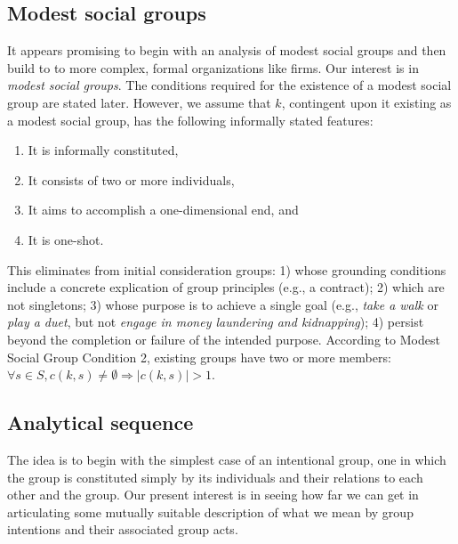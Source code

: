 \documentclass[
11pt,
titlepage,
reqno,
]{article}%
\theoremstyle{definition}
\begin{document}
	
	
	\subsection{Modest social groups} 
	It appears promising to begin with an analysis of modest social groups and then build to to more complex, formal organizations like firms.  Our interest is in \textit{modest social groups}. The conditions required for the existence of a modest social group are stated later. However, we assume that $k$, contingent upon it existing as a modest social group, has the following informally stated features:
	\begin{enumerate}
		\item It is informally constituted,  
		\item It consists of two or more individuals, 
		\item It aims to accomplish a one-dimensional end, and 
		\item It is one-shot.
	\end{enumerate}
	This eliminates from initial consideration groups: 1) whose grounding conditions include a concrete explication of group principles (e.g., a contract); 2) which are not singletons; 3) whose purpose is to achieve a single goal (e.g., \textit{take a walk} or \textit{play a duet}, but not \textit{engage in money laundering and kidnapping}); 4) persist beyond the completion or failure of the intended purpose. According to Modest Social Group Condition 2, existing groups have two or more members:  $\forall s\in S, c(k,s)\ne\emptyset\Rightarrow |c(k,s)|>1$.  
	
	\subsection{Analytical sequence}
	The idea is to begin with the simplest case of an intentional group, one in which the group is constituted  simply by its individuals and their relations to each other and the group. Our present interest is in seeing how far we can get in articulating some mutually suitable description of what we mean by group intentions and their associated group acts. 
	
\end{document}
